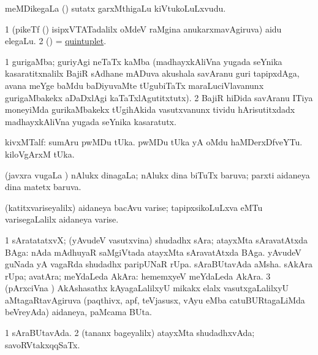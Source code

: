 \bentry
{}
\gl{\nA}
\bmng
meMDikegaLa () sutatx garxMthigaLu kiVtukoLuLxvudu. 
\emng
\eentry

\bentry
{}
\gl{\nA}
\bmng
\bnum
\num{1} (pikeTf () isipxVTATadalilx oMdeV raMgina anukarxmavAgiruva) aidu elegaLu. 
\num{2} (\ame) = \hyperlink{quintuplet}{quintuplet}. 
\enum
\emng
\eentry

\bentry
{}
\gl{\nA}
\expl{(\ca)}
\bmng
\bnum
\num{1} gurigaMba; guriyAgi neTaTx kaMba (madhayxkAliVna yugada seYnika kasaratitxnalilx BajiR sAdhane mADuva akushala savAranu guri tapipxdAga, avana meYge baMdu baDiyuvaMte tUgubiTaTx maraLuciVlavanunx gurigaMbakekx aDaDxlAgi kaTaTxlAgutitxtutx). 
\num{2} BajiR hiDida savAranu ITiya moneyiMda gurikaMbakekx tUgihAkida vasutxvanunx tividu hArisutitxdadx madhayxkAliVna yugada seYnika kasaratutx.  
\enum
\emng
\eentry

\bentry
{}
\gl{\nA}
\bmng
kivxMTalf: 
\banum
{} sumAru  pwMDu tUka. 
  pwMDu tUka yA oMdu haMDerxDfveYTu. 
  kiloVgArxM tUka. 
\eanum
\emng
\eentry

\bentry
{}
\gl{\gu}
\bmng
(javxra \mo vugaLa \vi) nAlukx dinagaLa; nAlukx dina biTuTx baruva; parxti aidaneya dina matetx baruva. 
\emng
\eentry

\bentry
{}
\gl{\nA}
\bmng
(katitxvariseyalilx) aidaneya bacAvu varise; tapipxsikoLuLxva eMTu varisegaLalilx aidaneya varise. 
\emng
\eentry

\bentry
{}
\gl{\nA}
\bmng
\bnum
\num{1} sAratatatxvX; (yAvudeV vasutxvina) shudadhx sAra; atayxMta sAravatAtxda BAga:  nAda mAdhuyaR saMgiVtada atayxMta sAravatAtxda BAga. 
 yAvudeV guNada yA vagaRda 
\banum
{} shudadhx paripUNaR rUpa. 
 sAraBUtavAda aMsha. 
 sAkAra rUpa; avatAra; meYdaLeda AkAra:  hememxyeV meYdaLeda AkAra. 
\eanum
\numie
\num{3} (pArxciVna \tashA) AkAshasathx kAyagaLalilxyU mikakx elalx vasutxgaLalilxyU aMtagaRtavAgiruva (paqthivx, apf, teVjasusx, vAyu eMba catuBURtagaLiMda beVreyAda) aidaneya, paMcama BUta. 
\enum
\emng
\eentry

\bentry
{}
\gl{\gu}
\bmng
\bnum
\num{1} sAraBUtavAda. 
\num{2} (tananx bageyalilx) atayxMta shudadhxvAda; savoRVtakxqqSaTx. 
\enum
\emng
\eentry

